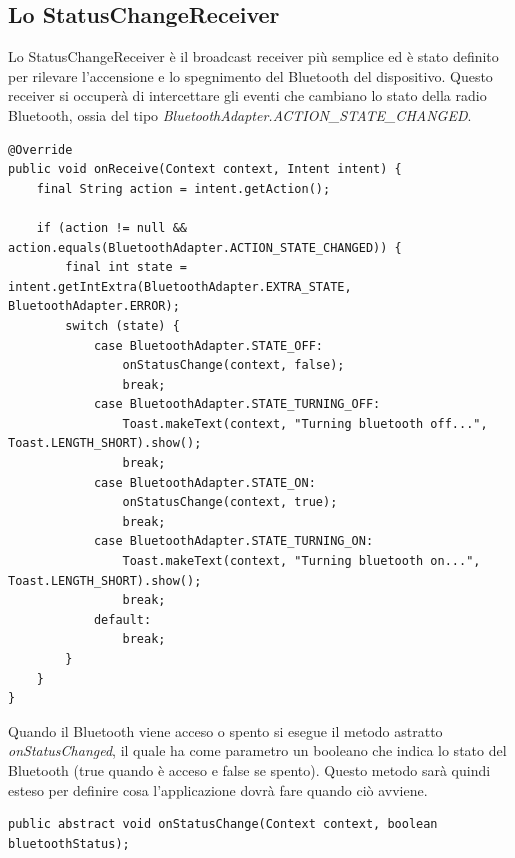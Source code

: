 \subsection{Lo StatusChangeReceiver}
Lo StatusChangeReceiver è il broadcast receiver più semplice ed è stato definito per rilevare l'accensione e lo spegnimento del Bluetooth del dispositivo. Questo receiver si occuperà di intercettare gli eventi che cambiano lo stato della radio Bluetooth, ossia del tipo \textit{BluetoothAdapter.ACTION\_STATE\_CHANGED}.
\begin{verbatim}
@Override
public void onReceive(Context context, Intent intent) {
    final String action = intent.getAction();

    if (action != null && action.equals(BluetoothAdapter.ACTION_STATE_CHANGED)) {
        final int state = intent.getIntExtra(BluetoothAdapter.EXTRA_STATE, BluetoothAdapter.ERROR);
        switch (state) {
            case BluetoothAdapter.STATE_OFF:
                onStatusChange(context, false);
                break;
            case BluetoothAdapter.STATE_TURNING_OFF:
                Toast.makeText(context, "Turning bluetooth off...", Toast.LENGTH_SHORT).show();
                break;
            case BluetoothAdapter.STATE_ON:
                onStatusChange(context, true);
                break;
            case BluetoothAdapter.STATE_TURNING_ON:
                Toast.makeText(context, "Turning bluetooth on...", Toast.LENGTH_SHORT).show();
                break;
            default:
                break;
        }
    }
}
\end{verbatim}

Quando il Bluetooth viene acceso o spento si esegue il metodo astratto \textit{onStatusChanged}, il quale ha come parametro un booleano che indica lo stato del Bluetooth (true quando è acceso e false se spento). Questo metodo sarà quindi esteso per definire cosa l'applicazione dovrà fare quando ciò avviene.
\begin{verbatim}
public abstract void onStatusChange(Context context, boolean bluetoothStatus);
\end{verbatim}

